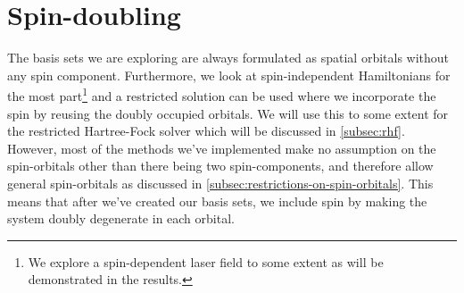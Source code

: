     \section{Spin-doubling}
        The basis sets we are exploring are always formulated as spatial
        orbitals without any spin component.
        Furthermore, we look at spin-independent Hamiltonians for the most
        part\footnote{%
            We explore a spin-dependent laser field to some extent as will be
            demonstrated in the results.
        } and a restricted solution can be used where we incorporate the spin by
        reusing the doubly occupied orbitals.
        We will use this to some extent for the restricted Hartree-Fock solver
        which will be discussed in \autoref{subsec:rhf}.
        However, most of the methods we've implemented make no assumption on the
        spin-orbitals other than there being two spin-components, and therefore
        allow general spin-orbitals as discussed in
        \autoref{subsec:restrictions-on-spin-orbitals}.
        This means that after we've created our basis sets, we include spin by
        making the system doubly degenerate in each orbital.

